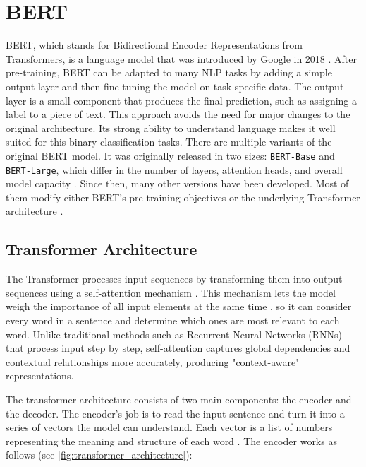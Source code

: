 
\section{BERT}
    BERT, which stands for Bidirectional Encoder Representations from Transformers, is a language model that was introduced by Google in 2018 \parencite{devlinBERTPretrainingDeep2019}. After pre-training, BERT can be adapted to many NLP tasks by adding a simple output layer and then fine-tuning the model on task-specific data. The output layer is a small component that produces the final prediction, such as assigning a label to a piece of text. This approach avoids the need for major changes to the original architecture. Its strong ability to understand language makes it well suited for this binary classification tasks. There are multiple variants of the original BERT model. It was originally released in two sizes: \texttt{BERT-Base} and \texttt{BERT-Large}, which differ in the number of layers, attention heads, and overall model capacity \parencite{devlinBERTPretrainingDeep2019}. Since then, many other versions have been developed. Most of them modify either BERT’s pre-training objectives or the underlying Transformer architecture \parencite{libovickyHowLanguageNeutralMultilingual2019}.

\subsection{Transformer Architecture} \label{subsection:transformer_arch}
    The Transformer processes input sequences by transforming them into output sequences using a self-attention mechanism \parencite{phuongFormalAlgorithmsTransformers2022}. This mechanism lets the model weigh the importance of all input elements at the same time \parencite{xiaoIntroductionTransformersNLP2023}, so it can consider every word in a sentence and determine which ones are most relevant to each word. Unlike traditional methods such as Recurrent Neural Networks (RNNs) that process input step by step, self-attention captures global dependencies and contextual relationships more accurately, producing "context-aware" representations. 

    The transformer architecture consists of two main components: the encoder and the decoder. The encoder’s job is to read the input sentence and turn it into a series of vectors the model can understand. Each vector is a list of numbers representing the meaning and structure of each word \parencite{xiaoIntroductionTransformersNLP2023}. The encoder works as follows (see \autoref{fig:transformer_architecture}):

